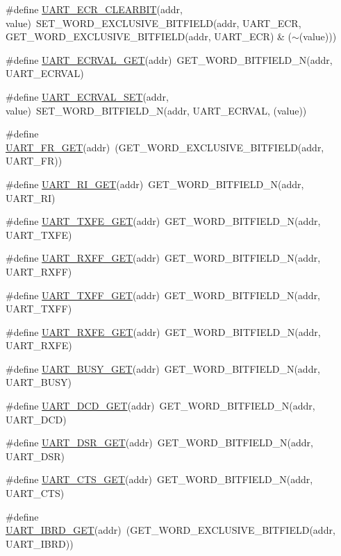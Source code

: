 \begin{DoxyCompactItemize}
\item 
\#define \hyperlink{a00574_a6a2e3ea81b308ed0e9440f744786afa8}{UART\_\-ECR\_\-CLEARBIT}(addr, value)~SET\_\-WORD\_\-EXCLUSIVE\_\-BITFIELD(addr, UART\_\-ECR, GET\_\-WORD\_\-EXCLUSIVE\_\-BITFIELD(addr, UART\_\-ECR) \& ($\sim$(value)))
\item 
\#define \hyperlink{a00574_a826fbf4e30942e2a0faf64178f3bedd1}{UART\_\-ECRVAL\_\-GET}(addr)~GET\_\-WORD\_\-BITFIELD\_\-N(addr, UART\_\-ECRVAL)
\item 
\#define \hyperlink{a00574_ae72373dbf8d365634638451ff0e70b5e}{UART\_\-ECRVAL\_\-SET}(addr, value)~SET\_\-WORD\_\-BITFIELD\_\-N(addr, UART\_\-ECRVAL, (value))
\item 
\#define \hyperlink{a00574_a4a122f9696a50c598b77ff463bdfc200}{UART\_\-FR\_\-GET}(addr)~(GET\_\-WORD\_\-EXCLUSIVE\_\-BITFIELD(addr, UART\_\-FR))
\item 
\#define \hyperlink{a00574_aad61e84962dcd537b492d111b05af3d0}{UART\_\-RI\_\-GET}(addr)~GET\_\-WORD\_\-BITFIELD\_\-N(addr, UART\_\-RI)
\item 
\#define \hyperlink{a00574_ad6dab2f4bd05bd28fe33932b9b325321}{UART\_\-TXFE\_\-GET}(addr)~GET\_\-WORD\_\-BITFIELD\_\-N(addr, UART\_\-TXFE)
\item 
\#define \hyperlink{a00574_a16f24023aaca99afd9fae91bd2f0845c}{UART\_\-RXFF\_\-GET}(addr)~GET\_\-WORD\_\-BITFIELD\_\-N(addr, UART\_\-RXFF)
\item 
\#define \hyperlink{a00574_a8527a74451b956051de082c3e34c6fad}{UART\_\-TXFF\_\-GET}(addr)~GET\_\-WORD\_\-BITFIELD\_\-N(addr, UART\_\-TXFF)
\item 
\#define \hyperlink{a00574_ae4d9e87a86e2554fd3af6bf44ca67d5f}{UART\_\-RXFE\_\-GET}(addr)~GET\_\-WORD\_\-BITFIELD\_\-N(addr, UART\_\-RXFE)
\item 
\#define \hyperlink{a00574_a71136411098634d7f5cdb3a94829fcea}{UART\_\-BUSY\_\-GET}(addr)~GET\_\-WORD\_\-BITFIELD\_\-N(addr, UART\_\-BUSY)
\item 
\#define \hyperlink{a00574_ac6535cf274edfd27edb161b786aa3181}{UART\_\-DCD\_\-GET}(addr)~GET\_\-WORD\_\-BITFIELD\_\-N(addr, UART\_\-DCD)
\item 
\#define \hyperlink{a00574_af6a01634c9aaba643a1d743849e0cce8}{UART\_\-DSR\_\-GET}(addr)~GET\_\-WORD\_\-BITFIELD\_\-N(addr, UART\_\-DSR)
\item 
\#define \hyperlink{a00574_aa4d31557b710bc9778d606462fc38033}{UART\_\-CTS\_\-GET}(addr)~GET\_\-WORD\_\-BITFIELD\_\-N(addr, UART\_\-CTS)
\item 
\#define \hyperlink{a00574_a1e543971ca5bd95ea46c433d44ac0e88}{UART\_\-IBRD\_\-GET}(addr)~(GET\_\-WORD\_\-EXCLUSIVE\_\-BITFIELD(addr, UART\_\-IBRD))

\end{DoxyCompactItemize}
